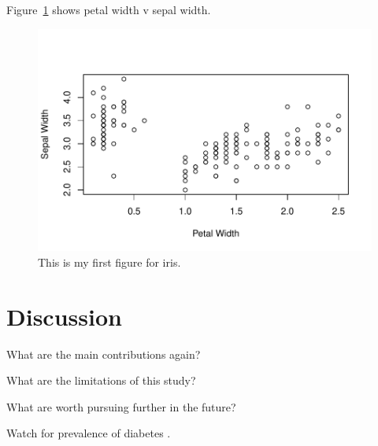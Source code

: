 \documentclass[12pt]{article}
\begin{document}
Figure~\ref{fig:iris} shows petal width v sepal width.


\begin{figure}[tbp]
  \centering
  \includegraphics[width=\textwidth]{iris.pdf}
  \caption{This is my first figure for iris.}
  \label{fig:iris}
\end{figure}

\section{Discussion}
\label{sec:disc}

What are the main contributions again?

What are the limitations of this study?

What are worth pursuing further in the future?

\lipsum[1]
Watch for prevalence of diabetes \citep{yuan2006model}.



\end{document}
